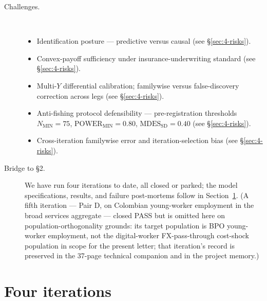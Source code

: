 \begin{description}
  \item[Challenges.]\hfill\\
  \begin{itemize}
    \item Identification posture --- predictive versus causal (see \S\ref{sec:4-risks}).
    \item Convex-payoff sufficiency under insurance-underwriting standard (see \S\ref{sec:4-risks}).
    \item Multi-\(Y\) differential calibration; familywise versus false-discovery correction across legs (see \S\ref{sec:4-risks}).
    \item Anti-fishing protocol defensibility --- pre-registration thresholds \(N_{\mathrm{MIN}}=75\), \(\mathrm{POWER}_{\mathrm{MIN}}=0.80\), \(\mathrm{MDES}_{\mathrm{SD}}=0.40\) (see \S\ref{sec:4-risks}).
    \item Cross-iteration familywise error and iteration-selection bias (see \S\ref{sec:4-risks}).
  \end{itemize}
  \item[Bridge to \S2.] We have run four iterations to date, all closed or parked; the model specifications, results, and failure post-mortems follow in Section~\ref{sec:2}. (A fifth iteration --- Pair D, on Colombian young-worker employment in the broad services aggregate --- closed PASS but is omitted here on population-orthogonality grounds: its target population is BPO young-worker employment, not the digital-worker FX-pass-through cost-shock population in scope for the present letter; that iteration's record is preserved in the 37-page technical companion and in the project memory.)
\end{description}

\section{Four iterations}\label{sec:2}

